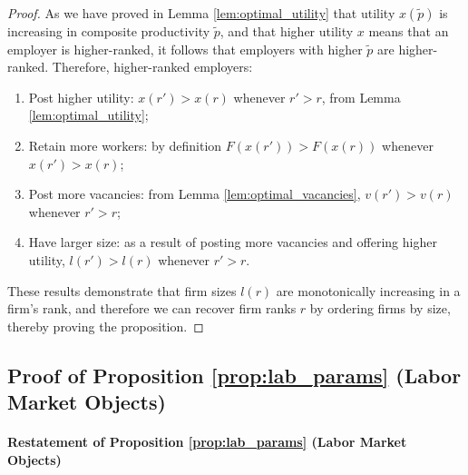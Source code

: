 \begin{proof}
    As we have proved in Lemma \ref{lem:optimal_utility} that utility $x(\tilde{p})$ is increasing in composite productivity $\tilde{p}$, and that higher utility $x$ means that an employer is higher-ranked, it follows that employers with higher $\tilde{p}$ are higher-ranked. Therefore, higher-ranked employers:
    \begin{enumerate}
        \item Post higher utility: $x(r') > x(r)$ whenever $r' > r$, from Lemma \ref{lem:optimal_utility};
        \item Retain more workers: by definition $F(x(r')) > F(x(r))$ whenever $x(r') > x(r)$;
        \item Post more vacancies: from Lemma \ref{lem:optimal_vacancies}, $v(r') > v(r)$ whenever $r'>r$;
        \item Have larger size: as a result of posting more vacancies and offering higher utility, $l(r') > l(r)$ whenever $r'>r$.
    \end{enumerate}
    These results demonstrate that firm sizes $l(r)$ are monotonically increasing in a firm's rank, and therefore we can recover firm ranks $r$ by ordering firms by size, thereby proving the proposition.
\end{proof}


\subsection{Proof of Proposition \ref{prop:lab_params} (Labor Market Objects)\label{app:proof_lab_params}}

\paragraph{Restatement of Proposition \ref{prop:lab_params} (Labor Market Objects)}

